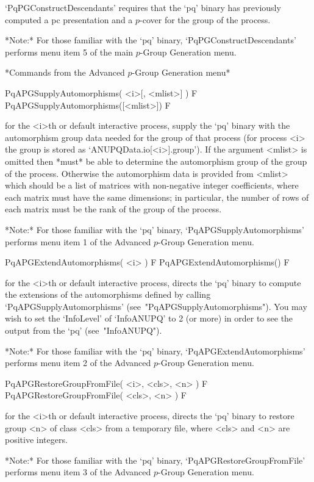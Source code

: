 `PqPGConstructDescendants' requires that the `pq' binary  has  previously
computed a pc presentation and a $p$-cover for the group of the process.

*Note:* 
For those  familiar  with  the  `pq'  binary,  `PqPGConstructDescendants'
performs menu item 5 of the main $p$-Group Generation menu.

*Commands from the Advanced $p$-Group Generation menu*

\>PqAPGSupplyAutomorphisms( <i>[, <mlist>] ) F
\>PqAPGSupplyAutomorphisms([<mlist>]) F

for the <i>th or default interactive {\ANUPQ} process,  supply  the  `pq'
binary with the automorphism group data needed  for  the  group  of  that
process    (for    process    <i>    the    group    is     stored     as
`ANUPQData.io[<i>].group'). If  the  argument  <mlist>  is  omitted  then
{\GAP} *must* be able to determine the automorphism group of the group of
the process. Otherwise the automorphism data  is  provided  from  <mlist>
which  should  be  a  list  of   matrices   with   non-negative   integer
coefficients, where  each  matrix  must  have  the  same  dimensions;  in
particular, the number of rows of each matrix must be  the  rank  of  the
group of the process.

*Note:*
For those  familiar  with  the  `pq'  binary,  `PqAPGSupplyAutomorphisms'
performs menu item 1 of the Advanced $p$-Group Generation menu.

\>PqAPGExtendAutomorphisms( <i> ) F
\>PqAPGExtendAutomorphisms() F

for the <i>th or default interactive {\ANUPQ} process, directs  the  `pq'
binary to compute the extensions of the automorphisms defined by  calling
`PqAPGSupplyAutomorphisms' (see~"PqAPGSupplyAutomorphisms"). You may wish
to set the `InfoLevel' of `InfoANUPQ' to 2 (or more) in order to see  the
output from the `pq' (see~"InfoANUPQ").

*Note:*
For  those  familiar  with  the  `pq'  binary, `PqAPGExtendAutomorphisms'
performs menu item 2 of the Advanced $p$-Group Generation menu.

\>PqAPGRestoreGroupFromFile( <i>, <cls>, <n> ) F
\>PqAPGRestoreGroupFromFile( <cls>, <n> ) F

for the <i>th or default interactive {\ANUPQ} process, directs  the  `pq'
binary to restore group <n> of class <cls> from a temporary  file,  where
<cls> and <n> are positive integers.

*Note:*
For those familiar  with  the  `pq'  binary,  `PqAPGRestoreGroupFromFile'
performs menu item 3 of the Advanced $p$-Group Generation menu.

